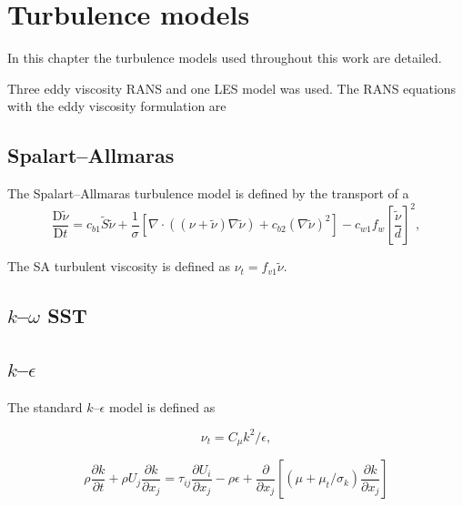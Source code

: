 \chapter{Turbulence models}
\doublespace

In this chapter the turbulence models used throughout this work are detailed.

Three eddy viscosity RANS and one LES model was used. The RANS equations with
the eddy viscosity formulation are



\section{Spalart--Allmaras}

The Spalart--Allmaras turbulence model is defined by the transport of a
\begin{equation}
\frac{\mathrm{D} \tilde{\nu}}{\mathrm{D} t}
= c_{b1} \tilde{S} \tilde{\nu}
+ \frac{1}{\sigma}
\left[
\nabla \cdot \left( (\nu + \tilde{\nu}) \nabla \tilde{\nu} \right)
+ c_{b2} (\nabla \tilde{\nu})^2
\right]
- c_{w1} f_w \left[ \frac{\tilde{\nu}}{d} \right]^2,
\label{eq:SA}
\end{equation}

The SA turbulent viscosity is defined as $\nu_t = f_{v1} \tilde{\nu}$.


\section{$k$--$\omega$ SST}


\section{$k$--$\epsilon$}

The standard $k$--$\epsilon$ model is defined as \cite{Wilcox1993}

\begin{equation}
    \nu_t = C_\mu k^2 / \epsilon,
    \label{eq:kepsilon-nut}
\end{equation}

\begin{equation}
    \rho \frac{\partial k}{\partial t}
    + \rho U_j \frac{\partial k}{\partial x_j}
    = \tau_{ij} \frac{\partial U_i}{\partial x_j}
    - \rho \epsilon
    + \frac{\partial}{\partial x_j}
    \left[
    (\mu + \mu_t/\sigma_k) \frac{\partial k}{\partial x_j}
    \right]
    \label{eq:kepsilon-k}
\end{equation}

